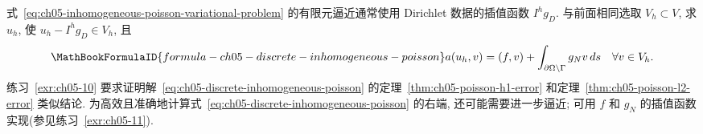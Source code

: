 式~\eqref{eq:ch05-inhomogeneous-poisson-variational-problem} 的有限元逼近通常使用 Dirichlet 数据的插值函数 $I^h g_D$. 与前面相同选取 $V_h\subset V$, 求 $u_h$, 使 $u_h-I^h g_D\in V_h$, 且
\begin{equation}
\MathBookFormulaID{formula-ch05-discrete-inhomogeneous-poisson}
\label{eq:ch05-discrete-inhomogeneous-poisson}
a(u_h,v)=(f,v)+\int_{\partial\Omega\setminus\Gamma}g_Nv\,ds
\quad\forall v\in V_h.
\end{equation}
练习~\ref{exr:ch05-10} 要求证明解~\eqref{eq:ch05-discrete-inhomogeneous-poisson} 的定理~\ref{thm:ch05-poisson-h1-error} 和定理~\ref{thm:ch05-poisson-l2-error} 类似结论. 为高效且准确地计算式~\eqref{eq:ch05-discrete-inhomogeneous-poisson} 的右端, 还可能需要进一步逼近; 可用 $f$ 和 $g_N$ 的插值函数实现(参见练习~\ref{exr:ch05-11}).
